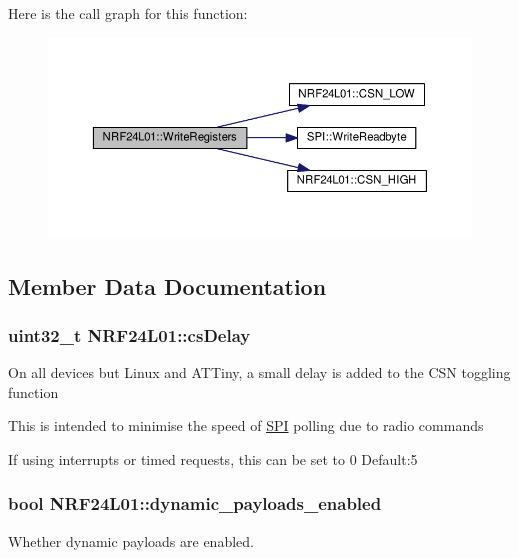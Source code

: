 Here is the call graph for this function\+:\nopagebreak
\begin{figure}[H]
\begin{center}
\leavevmode
\includegraphics[width=350pt]{classNRF24L01_ac7d69c51eca87f16fa3a30b5e8aa85cb_cgraph}
\end{center}
\end{figure}




\subsection{Member Data Documentation}
\subsubsection[{\texorpdfstring{cs\+Delay}{csDelay}}]{\setlength{\rightskip}{0pt plus 5cm}uint32\+\_\+t N\+R\+F24\+L01\+::cs\+Delay}\hypertarget{classNRF24L01_abae8b8afbf747344006d6163c607be00}{}\label{classNRF24L01_abae8b8afbf747344006d6163c607be00}
On all devices but Linux and A\+T\+Tiny, a small delay is added to the C\+SN toggling function

This is intended to minimise the speed of \hyperlink{classSPI}{S\+PI} polling due to radio commands

If using interrupts or timed requests, this can be set to 0 Default\+:5 
\subsubsection[{\texorpdfstring{dynamic\+\_\+payloads\+\_\+enabled}{dynamic_payloads_enabled}}]{\setlength{\rightskip}{0pt plus 5cm}bool N\+R\+F24\+L01\+::dynamic\+\_\+payloads\+\_\+enabled\hspace{0.3cm}{\ttfamily [private]}}\hypertarget{classNRF24L01_ae319d1b6a3d950888d2608cc69efb07c}{}\label{classNRF24L01_ae319d1b6a3d950888d2608cc69efb07c}
Whether dynamic payloads are enabled. 
